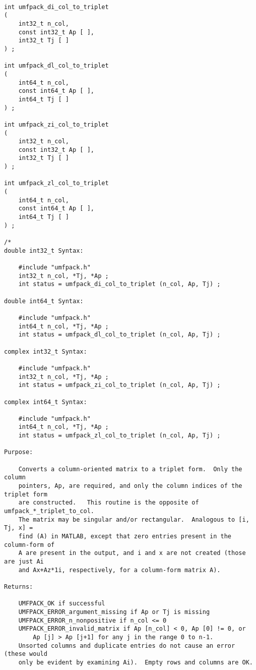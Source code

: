 \documentclass[11pt]{article}
\begin{document}
{\footnotesize
\begin{verbatim}

int umfpack_di_col_to_triplet
(
    int32_t n_col,
    const int32_t Ap [ ],
    int32_t Tj [ ]
) ;

int umfpack_dl_col_to_triplet
(
    int64_t n_col,
    const int64_t Ap [ ],
    int64_t Tj [ ]
) ;

int umfpack_zi_col_to_triplet
(
    int32_t n_col,
    const int32_t Ap [ ],
    int32_t Tj [ ]
) ;

int umfpack_zl_col_to_triplet
(
    int64_t n_col,
    const int64_t Ap [ ],
    int64_t Tj [ ]
) ;

/*
double int32_t Syntax:

    #include "umfpack.h"
    int32_t n_col, *Tj, *Ap ;
    int status = umfpack_di_col_to_triplet (n_col, Ap, Tj) ;

double int64_t Syntax:

    #include "umfpack.h"
    int64_t n_col, *Tj, *Ap ;
    int status = umfpack_dl_col_to_triplet (n_col, Ap, Tj) ;

complex int32_t Syntax:

    #include "umfpack.h"
    int32_t n_col, *Tj, *Ap ;
    int status = umfpack_zi_col_to_triplet (n_col, Ap, Tj) ;

complex int64_t Syntax:

    #include "umfpack.h"
    int64_t n_col, *Tj, *Ap ;
    int status = umfpack_zl_col_to_triplet (n_col, Ap, Tj) ;

Purpose:

    Converts a column-oriented matrix to a triplet form.  Only the column
    pointers, Ap, are required, and only the column indices of the triplet form
    are constructed.   This routine is the opposite of umfpack_*_triplet_to_col.
    The matrix may be singular and/or rectangular.  Analogous to [i, Tj, x] =
    find (A) in MATLAB, except that zero entries present in the column-form of
    A are present in the output, and i and x are not created (those are just Ai
    and Ax+Az*1i, respectively, for a column-form matrix A).

Returns:

    UMFPACK_OK if successful
    UMFPACK_ERROR_argument_missing if Ap or Tj is missing
    UMFPACK_ERROR_n_nonpositive if n_col <= 0
    UMFPACK_ERROR_invalid_matrix if Ap [n_col] < 0, Ap [0] != 0, or
        Ap [j] > Ap [j+1] for any j in the range 0 to n-1.
    Unsorted columns and duplicate entries do not cause an error (these would
    only be evident by examining Ai).  Empty rows and columns are OK.


\end{verbatim}}
\end{document}
